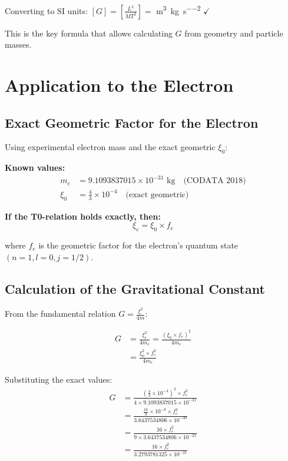 \documentclass[12pt,a4paper]{article}
\theoremstyle{definition}
\begin{document}
		Converting to SI units: $[G] = \left[\frac{L^3}{MT^2}\right] = $ \si{\metre\cubed\per\kilogram\per\second\squared} $\checkmark$
	 
	
	This is the key formula that allows calculating $G$ from geometry and particle masses.
	
	\section{Application to the Electron}
	
	\subsection{Exact Geometric Factor for the Electron}
	
	Using experimental electron mass and the exact geometric $\xi_0$:
	
	\textbf{Known values:}
	\begin{align}
		m_e &= 9.1093837015 \times 10^{-31} \text{ kg} \quad \text{(CODATA 2018)}\\
		\xi_0 &= \frac{4}{3} \times 10^{-4} \quad \text{(exact geometric)}
	\end{align}
	
	\textbf{If the T0-relation holds exactly, then:}
	\begin{equation}
		\xi_e = \xi_0 \times f_e
	\end{equation}
	
	where $f_e$ is the geometric factor for the electron's quantum state $(n=1, l=0, j=1/2)$.
	
	\subsection{Calculation of the Gravitational Constant}
	
	From the fundamental relation $G = \frac{\xi^2}{4m}$:
	
	\begin{align}
		G &= \frac{\xi_e^2}{4m_e} = \frac{(\xi_0 \times f_e)^2}{4m_e}\\
		&= \frac{\xi_0^2 \times f_e^2}{4m_e}
	\end{align}
	
	Substituting the exact values:
	\begin{align}
		G &= \frac{\left(\frac{4}{3} \times 10^{-4}\right)^2 \times f_e^2}{4 \times 9.1093837015 \times 10^{-31}}\\
		&= \frac{\frac{16}{9} \times 10^{-8} \times f_e^2}{3.6437534806 \times 10^{-30}}\\
		&= \frac{16 \times f_e^2}{9 \times 3.6437534806 \times 10^{-22}}\\
		&= \frac{16 \times f_e^2}{3.2793781325 \times 10^{-21}}
	\end{align}
	
\end{document}
